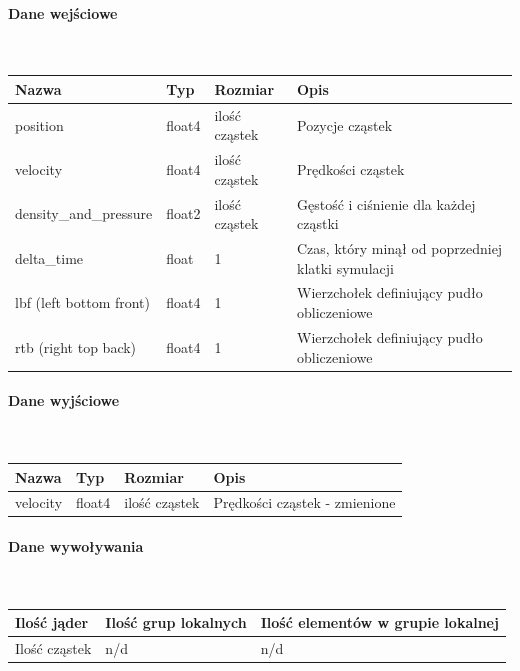 \documentclass[polish, 12pt]{aghthesis}
\begin{document}
				\paragraph{Dane wejściowe} \ \\
					\begin{tabular}{| p{} | p{} | p{} | p{} |}
					\hline
						Nazwa & Typ & Rozmiar & Opis \\
					\hline
						position & float4 & ilość cząstek & Pozycje cząstek \\
					\hline
						velocity & float4 & ilość cząstek & Prędkości cząstek \\
					\hline
						density\_and\_pressure & float2 & ilość cząstek & Gęstość i ciśnienie dla każdej cząstki\\
					\hline
						delta\_time & float & 1 & Czas, który minął od poprzedniej klatki symulacji \\ 
					\hline
						lbf (left bottom front)& float4 & 1 & Wierzchołek definiujący pudło obliczeniowe \\ 
					\hline
						rtb (right top back) & float4 & 1 & Wierzchołek definiujący pudło obliczeniowe  \\ 
					\hline
				\end{tabular}
				\paragraph{Dane wyjściowe} \ \\
					\begin{tabular}{| p{} | p{} | p{} | p{} |}
					\hline
						Nazwa & Typ & Rozmiar & Opis \\
					\hline
						velocity & float4 & ilość cząstek & Prędkości cząstek - zmienione \\
					\hline
				\end{tabular}
				\paragraph{Dane wywoływania} \ \\
					\begin{tabular}{| p{} | p{} | p{}|}
					\hline
						Ilość jąder & Ilość grup lokalnych & Ilość elementów w grupie lokalnej \\
					\hline
						Ilość cząstek & n/d & n/d \\ 
					\hline
					\end{tabular}
\end{document}
